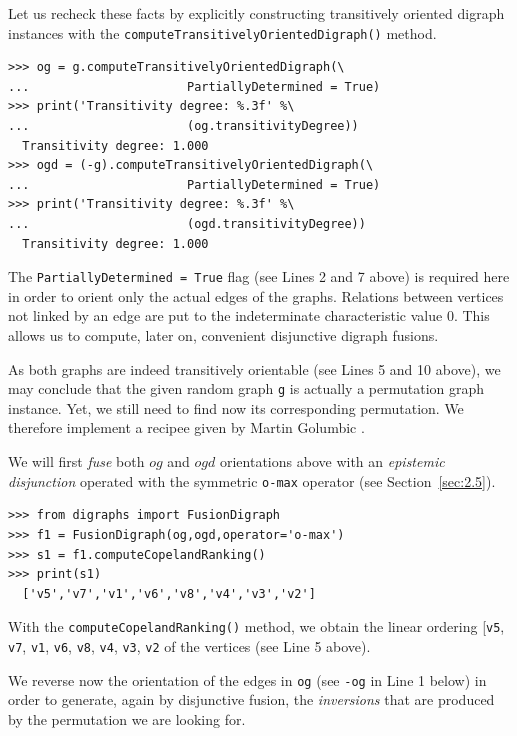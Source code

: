 Let us recheck these facts by explicitly constructing transitively oriented digraph instances with the \texttt{computeTransitivelyOrientedDigraph()} method.
\begin{lstlisting}
>>> og = g.computeTransitivelyOrientedDigraph(\
...                      PartiallyDetermined = True)
>>> print('Transitivity degree: %.3f' %\
...                      (og.transitivityDegree)) 
  Transitivity degree: 1.000
>>> ogd = (-g).computeTransitivelyOrientedDigraph(\
...                      PartiallyDetermined = True)
>>> print('Transitivity degree: %.3f' %\
...                      (ogd.transitivityDegree)) 
  Transitivity degree: 1.000
\end{lstlisting}
The \texttt{PartiallyDetermined = True} flag (see Lines 2 and 7 above) is required here in order to orient only the actual edges of the graphs. Relations between vertices not linked by an edge are put to the indeterminate characteristic value $0$. This allows us to compute, later on, convenient disjunctive digraph fusions.

As both graphs are indeed transitively orientable (see Lines 5 and 10 above), we may conclude that the given random graph \texttt{g} is actually a permutation graph instance. Yet, we still need to find now its corresponding permutation. We therefore implement a recipee given by Martin Golumbic \citep[p. 159]{GOL-2004}.

We will first \emph{fuse} both $og$ and $ogd$ orientations above with an \emph{epistemic disjunction} operated with the symmetric \texttt{o-max} operator (see Section~\vref{sec:2.5}).
\begin{lstlisting}
>>> from digraphs import FusionDigraph
>>> f1 = FusionDigraph(og,ogd,operator='o-max')
>>> s1 = f1.computeCopelandRanking()
>>> print(s1)
  ['v5','v7','v1','v6','v8','v4','v3','v2']
\end{lstlisting}
With the \texttt{computeCopelandRanking()} method, we obtain the linear ordering [\texttt{v5}, \texttt{v7}, \texttt{v1}, \texttt{v6}, \texttt{v8}, \texttt{v4}, \texttt{v3}, \texttt{v2} of the vertices (see Line 5 above).

We reverse now the orientation of the edges in \texttt{og} (see \texttt{-og} in Line 1 below) in order to generate, again by disjunctive fusion, the \emph{inversions} that are produced by the permutation we are looking for.

